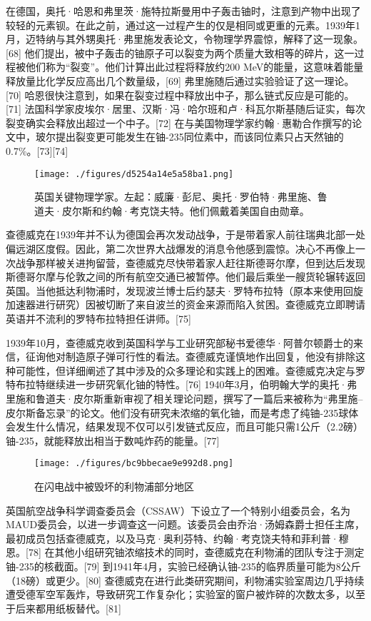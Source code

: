 在德国，奥托·哈恩和弗里茨·施特拉斯曼用中子轰击铀时，注意到产物中出现了较轻的元素钡。在此之前，通过这一过程产生的仅是相同或更重的元素。1939年1月，迈特纳与其外甥奥托·弗里施发表论文，令物理学界震惊，解释了这一现象。[68] 他们提出，被中子轰击的铀原子可以裂变为两个质量大致相等的碎片，这一过程被他们称为“裂变”。他们计算出此过程将释放约200 MeV的能量，这意味着能量释放量比化学反应高出几个数量级，[69] 弗里施随后通过实验验证了这一理论。[70] 哈恩很快注意到，如果在裂变过程中释放出中子，那么链式反应是可能的。[71] 法国科学家皮埃尔·居里、汉斯·冯·哈尔班和卢·科瓦尔斯基随后证实，每次裂变确实会释放出超过一个中子。[72] 在与美国物理学家约翰·惠勒合作撰写的论文中，玻尔提出裂变更可能发生在铀-235同位素中，而该同位素只占天然铀的0.7\%。[73][74]
\begin{figure}[ht]
\centering
\texttt{[image: ./figures/d5254a14e5a58ba1.png]}
\caption{英国关键物理学家。左起：威廉·彭尼、奥托·罗伯特·弗里施、鲁道夫·皮尔斯和约翰·考克饶夫特。他们佩戴着美国自由勋章。} \label{fig_ZMcdw_4}
\end{figure}
查德威克在1939年并不认为德国会再次发动战争，于是带着家人前往瑞典北部一处偏远湖区度假。因此，第二次世界大战爆发的消息令他感到震惊。决心不再像上一次战争那样被关进拘留营，查德威克尽快带着家人赶往斯德哥尔摩，但到达后发现斯德哥尔摩与伦敦之间的所有航空交通已被暂停。他们最后乘坐一艘货轮辗转返回英国。当他抵达利物浦时，发现波兰博士后约瑟夫·罗特布拉特（原本来使用回旋加速器进行研究）因被切断了来自波兰的资金来源而陷入贫困。查德威克立即聘请英语并不流利的罗特布拉特担任讲师。[75]

1939年10月，查德威克收到英国科学与工业研究部秘书爱德华·阿普尔顿爵士的来信，征询他对制造原子弹可行性的看法。查德威克谨慎地作出回复，他没有排除这种可能性，但详细阐述了其中涉及的众多理论和实践上的困难。查德威克决定与罗特布拉特继续进一步研究氧化铀的特性。[76] 1940年3月，伯明翰大学的奥托·弗里施和鲁道夫·皮尔斯重新审视了相关理论问题，撰写了一篇后来被称为“弗里施–皮尔斯备忘录”的论文。他们没有研究未浓缩的氧化铀，而是考虑了纯铀-235球体会发生什么情况，结果发现不仅可以引发链式反应，而且可能只需1公斤（2.2磅）铀-235，就能释放出相当于数吨炸药的能量。[77]
\begin{figure}[ht]
\centering
\texttt{[image: ./figures/bc9bbecae9e992d8.png]}
\caption{在闪电战中被毁坏的利物浦部分地区} \label{fig_ZMcdw_5}
\end{figure}
英国航空战争科学调查委员会（CSSAW）下设立了一个特别小组委员会，名为 MAUD委员会，以进一步调查这一问题。该委员会由乔治·汤姆森爵士担任主席，最初成员包括查德威克，以及马克·奥利芬特、约翰·考克饶夫特和菲利普·穆恩。[78] 在其他小组研究铀浓缩技术的同时，查德威克在利物浦的团队专注于测定铀-235的核截面。[79] 到1941年4月，实验已经确认铀-235的临界质量可能为8公斤（18磅）或更少。[80] 查德威克在进行此类研究期间，利物浦实验室周边几乎持续遭受德军空军轰炸，导致研究工作复杂化；实验室的窗户被炸碎的次数太多，以至于后来都用纸板替代。[81]

